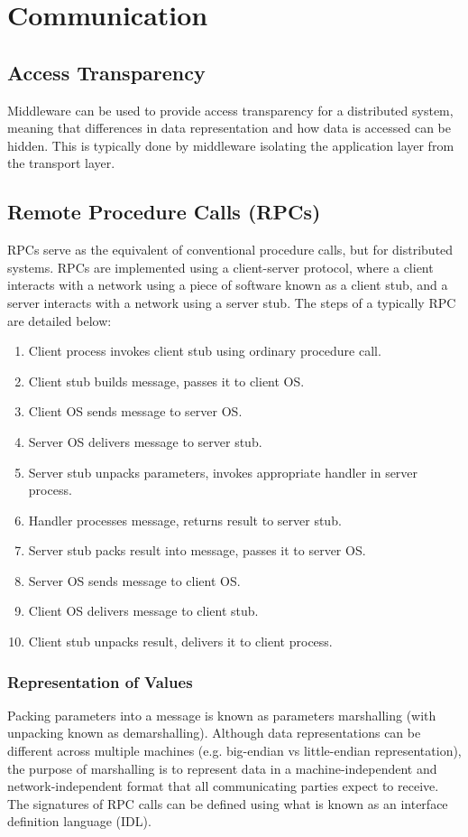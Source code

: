 \documentclass[12pt,titlepage]{article}
\let\stdsection\section
\renewcommand\section{\clearpage\stdsection}
\begin{document}
  \section{Communication}
    \subsection{Access Transparency}
      Middleware can be used to provide access transparency for a distributed system, meaning that differences in data representation and how data is accessed
      can be hidden. This is typically done by middleware isolating the application layer from the transport layer.

    \subsection{Remote Procedure Calls (RPCs)}
      RPCs serve as the equivalent of conventional procedure calls, but for distributed systems. RPCs are implemented using a client-server protocol, where
      a client interacts with a network using a piece of software known as a client stub, and a server interacts with a network using a server stub. The
      steps of a typically RPC are detailed below:
      \begin{enumerate}
        \item Client process invokes client stub using ordinary procedure call.
        \item Client stub builds message, passes it to client OS.
        \item Client OS sends message to server OS.
        \item Server OS delivers message to server stub.
        \item Server stub unpacks parameters, invokes appropriate handler in server process.
        \item Handler processes message, returns result to server stub.
        \item Server stub packs result into message, passes it to server OS.
        \item Server OS sends message to client OS.
        \item Client OS delivers message to client stub.
        \item Client stub unpacks result, delivers it to client process.
      \end{enumerate}

      \subsubsection{Representation of Values}
        Packing parameters into a message is known as parameters marshalling (with unpacking known as demarshalling). Although data representations can be
        different across multiple machines (e.g. big-endian vs little-endian representation), the purpose of marshalling is to represent data in a
        machine-independent and network-independent format that all communicating parties expect to receive. The signatures of RPC calls can be defined
        using what is known as an interface definition language (IDL).
\end{document}
